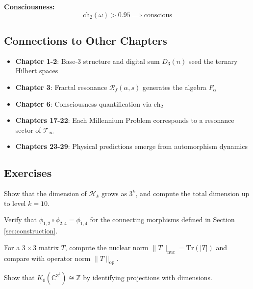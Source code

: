 \begin{defn}
\begin{tcolorbox}[colback=yellow!10!white, colframe=orange!75!black, title=Essential Formulas]
\textbf{Consciousness:}
\begin{equation*}
\text{ch}_2(\omega) > 0.95 \implies \text{conscious}
\end{equation*}
\end{tcolorbox}

\subsection{Connections to Other Chapters}

\begin{itemize}
\item \textbf{Chapter 1-2}: Base-3 structure and digital sum $D_3(n)$ seed the ternary Hilbert spaces
\item \textbf{Chapter 3}: Fractal resonance $\mathcal{R}_f(\alpha, s)$ generates the algebra $F_\alpha$
\item \textbf{Chapter 6}: Consciousness quantification via $\text{ch}_2$
\item \textbf{Chapters 17-22}: Each Millennium Problem corresponds to a resonance sector of $\mathcal{T}_\infty$
\item \textbf{Chapters 23-29}: Physical predictions emerge from automorphism dynamics
\end{itemize}

\subsection{Exercises}

\begin{exercise}
Show that the dimension of $\mathcal{H}_k$ grows as $3^k$, and compute the total dimension up to level $k=10$.
\end{exercise}

\begin{exercise}
Verify that $\phi_{1,2} \circ \phi_{2,4} = \phi_{1,4}$ for the connecting morphisms defined in Section \ref{sec:construction}.
\end{exercise}

\begin{exercise}
For a $3 \times 3$ matrix $T$, compute the nuclear norm $\|T\|_{\text{nuc}} = \text{Tr}(|T|)$ and compare with operator norm $\|T\|_{\text{op}}$.
\end{exercise}

\begin{exercise}
Show that $K_0(\mathbb{C}^{3^k}) \cong \mathbb{Z}$ by identifying projections with dimensions.
\end{exercise}


\end{defn}
